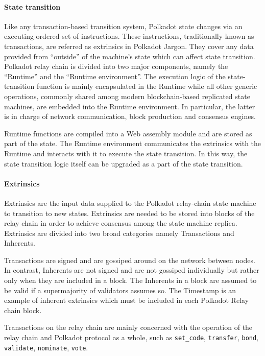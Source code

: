 \paragraph{State transition} Like any transaction-based transition system, Polkadot state changes via an executing ordered set of instructions. These instructions, traditionally known as transactions, are referred as extrinsics in Polkadot Jargon. They cover any data provided from ``outside'' of the machine's state which can affect state transition. Polkadot relay chain is divided into two major components, namely the ``Runtime'' and the ``Runtime environment''. The execution logic of the state-transition function is mainly encapsulated in the Runtime while all other generic operations, commonly shared among modern blockchain-based replicated state machines, are embedded into the Runtime environment. In particular, the latter is in charge of network communication, block production and consensus engines.

Runtime functions are compiled into a Web assembly module and are stored as part of the state. The Runtime environment communicates the extrinsics with the Runtime and interacts with it to execute the state transition. In this way, the state transition logic itself can be upgraded as a part of the state transition.

\paragraph{Extrinsics}

Extrinsics are the input data supplied to the Polkadot relay-chain state machine to transition to new states. Extrinsics are needed to be stored into blocks of the relay chain in order to achieve consensus among the state machine replica. Extrinsics are divided into two broad categories namely Transactions and Inherents.

Transactions are signed and are gossiped around on the network between nodes. In contrast, Inherents are not signed and are not gossiped individually but rather only when they are included in a block. The Inherents in a block are assumed to be valid if a supermajority of validators assumes so. The Timestamp is an example of inherent extrinsics which must be included in each Polkadot Relay chain block.

Transactions on the relay chain are mainly concerned with the operation of the relay chain and Polkadot protocol as a whole, such as \texttt{set\_code}, \texttt{transfer}, \texttt{bond}, \texttt{validate}, \texttt{nominate}, \texttt{vote}.

